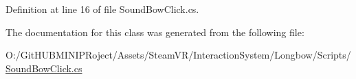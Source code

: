 Definition at line 16 of file Sound\+Bow\+Click.\+cs.



The documentation for this class was generated from the following file\+:\begin{DoxyCompactItemize}
\item 
O\+:/\+Git\+H\+U\+B\+M\+I\+N\+I\+P\+Roject/\+Assets/\+Steam\+V\+R/\+Interaction\+System/\+Longbow/\+Scripts/\mbox{\hyperlink{_sound_bow_click_8cs}{Sound\+Bow\+Click.\+cs}}\end{DoxyCompactItemize}
